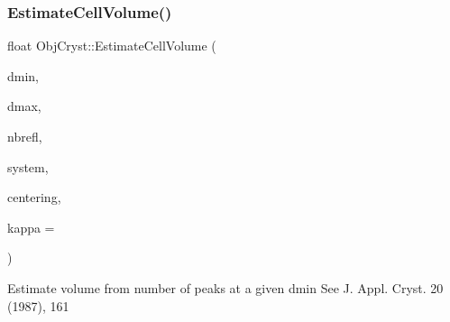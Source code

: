 \mbox{\label{namespace_obj_cryst_a4d39fa9e9e695122208106dea0bdd018}} 
\subsubsection{\texorpdfstring{EstimateCellVolume()}{EstimateCellVolume()}}
{\footnotesize\ttfamily float Obj\+Cryst\+::\+Estimate\+Cell\+Volume (\begin{DoxyParamCaption}\item[{const float}]{dmin,  }\item[{const float}]{dmax,  }\item[{const float}]{nbrefl,  }\item[{const \mbox{\hyperlink{namespace_obj_cryst_a9cd1d00f4ec9f0e75564ee151f47dd83}{Crystal\+System}}}]{system,  }\item[{const Crystal\+Centering}]{centering,  }\item[{const float}]{kappa = {} }\end{DoxyParamCaption})}

Estimate volume from number of peaks at a given dmin See J. Appl. Cryst. 20 (1987), 161


